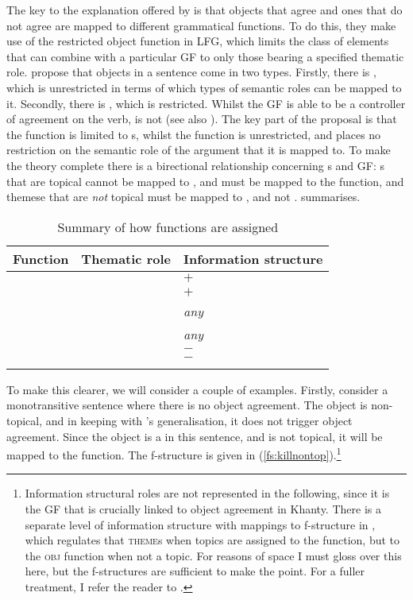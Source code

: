 \documentclass[output=paper
,modfonts
,nonflat]{langsci/langscibook}
\begin{document}
The key to the explanation offered by \citet{dn2011} is that objects that agree and ones that do not agree are mapped to different grammatical functions.
To do this, they make use of the restricted object function in LFG, which limits the class of elements that can combine with a particular GF to only those bearing a specified thematic role. 
\citeauthor{dn2011} propose that objects in a sentence come in two types.
Firstly, there is \object, which is unrestricted in terms of which types of semantic roles can be mapped to it. Secondly, there is \robj, which is restricted. 
Whilst the GF \object{} is able to be a controller of agreement on the verb, \robj{} is not (see also \citealt{buttking1996}). 
The key part of the proposal is that the \robj{} function is limited to \theme s, whilst the \object{} function is unrestricted, and places no restriction on the semantic role of the argument that it is mapped to. 
To make the theory complete there is a birectional relationship concerning \theme s and GF: \theme s that are topical cannot be mapped to \robj, and must be mapped to the \object{} function, and themese that are \emph{not} topical must be mapped to \robj, and not \object.
 summarises.

\begin{table}
	\caption{\label{tab:dntabsummary}Summary of how functions are assigned}
	\begin{tabular}{lll}
		\lsptoprule
		Function			&	Thematic role	&	Information structure\\
		\midrule
		\multirow{4}{*}{\object}	&	\theme{}		&	$+$\topic\\
		&	\patient{}		&	$+$\topic\\
		&	\goal			&	\emph{any}\\
		&	\causee		&	\emph{any}\\
		\midrule
		\multirow{2}{*}{\robj}	&	\theme		&	$-$\topic\\
		&	\patient		&	$-$\topic\\
		\lspbottomrule
	\end{tabular}
\end{table}

\noindent To make this clearer, we will consider a couple of examples. Firstly, consider a monotransitive sentence where there is no object agreement. 
The object is non-topical, and in keeping with \citeauthor{dn2011}'s generalisation, it does not trigger object agreement. 
Since the object is a \theme{} in this sentence, and is not topical, it will be mapped to the \robj{} function. The f-structure is given in (\ref{fs:killnontop}).\footnote{Information structural roles are not represented in the following, since it is the GF that is crucially linked to object agreement in Khanty.
There is a separate level of information structure with mappings to f-structure in \citet{dn2011}, which regulates that \textsc{theme}s when topics are assigned to the \robj{} function, but to the \textsc{obj} function when not a topic.
For reasons of space I must gloss over this here, but the f-structures are sufficient to make the point.
For a fuller treatment,  I refer the reader to \citet[][especially ch. 4]{dn2011}.}\largerpage[-1]
\end{document}
